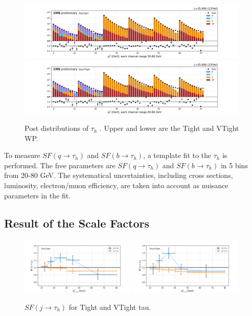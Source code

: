 \begin{figure}
    \centering
    \includegraphics[width=0.99\textwidth]{chapters/Appendix/sectionJetToTauh/figures/2020_tauID_postfit_lltauTight.png}
    \includegraphics[width=0.99\textwidth]{chapters/Appendix/sectionJetToTauh/figures/2020_tauID_postfit_lltauVTight.png}
    \caption{Post distributions of $\tau_h$ \pt. Upper and lower are the Tight and VTight WP. }
    \label{fig:appendix:fakeTauId:postfit}
\end{figure}




To measure $SF (q\to \tau_h)$  and $SF (b\to \tau_h)$, a template fit to the $\tau_h$ \pt is performed.  
The free parameters are $SF (q\to \tau_h)$  and $SF (b\to \tau_h)$ in 5 \pt bins from 20-80 GeV. 
The systematical uncertainties, including cross sections, luminosity, electron/muon
efficiency, are taken into account as nuisance parameters in the fit.



\subsection{Result of the Scale Factors}



\begin{figure}
    \centering
    \includegraphics[width=0.49\textwidth]{chapters/Appendix/sectionJetToTauh/figures/fit2_ptflavor2_lltauTight.png}
    \includegraphics[width=0.49\textwidth]{chapters/Appendix/sectionJetToTauh/figures/fit2_ptflavor2_lltauVTight.png}
    \caption{$SF (j\to \tau_h)$ for Tight and VTight tau.}
    \label{fig:appendix:fakeTauId:fit}
\end{figure}



